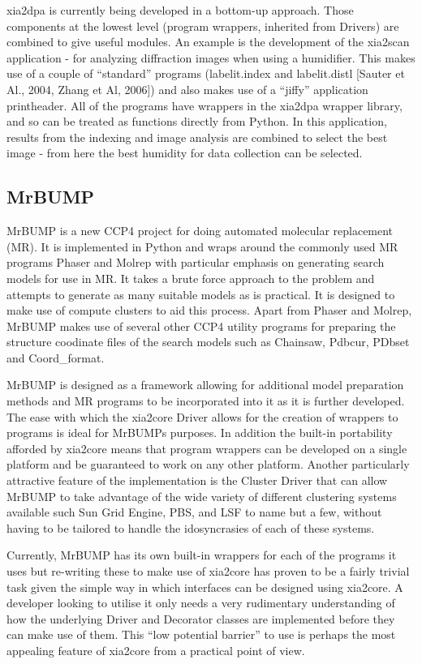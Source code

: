 \documentclass[a4paper, 11pt]{article}
\begin{document}
xia2dpa is currently being developed in a bottom-up approach. Those components
at the lowest level (program wrappers, inherited from Drivers) are combined
to give useful modules. An example is the development of the xia2scan
application - for analyzing diffraction images when using a humidifier. 
This makes use of 
a couple of ``standard'' programs (labelit.index and labelit.distl
[Sauter et Al., 2004, Zhang et Al, 2006]) and
also makes use of a ``jiffy'' application printheader. All of the programs
have wrappers in the xia2dpa wrapper library, and so can be treated as
functions directly from Python. In this application, results from the indexing
and image analysis are combined to select the best image - from here the 
best humidity for data collection can be selected.

\subsection{MrBUMP}

MrBUMP is a new CCP4 project for doing automated molecular replacement (MR). It is 
implemented in Python and wraps 
around the commonly used MR programs Phaser and Molrep with particular emphasis on
generating search models for use in MR. It takes a brute force approach to the problem
and attempts to generate as many suitable models as is practical. It is designed to
make use of compute clusters to aid this process. Apart from Phaser and Molrep, MrBUMP
makes use of several other CCP4 utility programs for preparing the structure coodinate
files of the search models such as Chainsaw, Pdbcur, PDbset and Coord\_format.

MrBUMP is designed as a framework allowing for additional model preparation methods and
MR programs to be incorporated into it as it is further developed. The ease with which
the xia2core Driver allows for the creation of wrappers to programs is ideal for MrBUMPs
purposes. In addition the built-in portability afforded by xia2core means that program
wrappers can be developed on a single platform and be guaranteed to work on any other
platform. Another particularly attractive feature of the implementation is the Cluster Driver that can
allow MrBUMP to 
take advantage of the wide variety of different clustering systems available such Sun Grid
Engine, PBS, and LSF to name but a few, without having to be tailored to handle the 
idosyncrasies of each of these systems.
 
Currently, MrBUMP has its own built-in wrappers for each of the programs it uses but 
re-writing these to make use of xia2core has proven to be a fairly trivial task given
the simple way in which interfaces can be designed using xia2core. A developer looking
to utilise it only needs a very rudimentary understanding of how the underlying Driver
and Decorator classes are implemented before they can make use of them. This ``low potential
barrier'' to use is perhaps the most appealing feature of xia2core from a practical point of view.     
\end{document}
